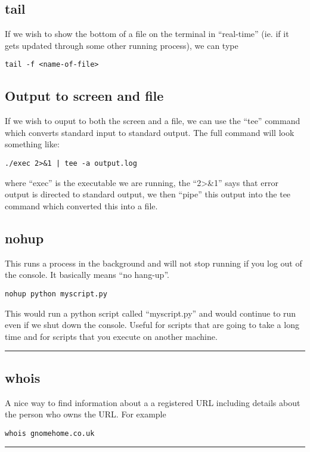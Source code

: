 \documentclass[a4paper, 10pt]{article}
\newcommand{\mybotrule}{\vspace{4mm}\hrule}
\begin{document}
\subsection*{tail}
\label{sec:tail}

If we wish to show the bottom of a file on the terminal in
``real-time'' (ie. if it gets updated through some other running
process), we can type 
\begin{verbatim}
tail -f <name-of-file>
\end{verbatim}

\subsection*{Output to screen and file}
\label{sec:output-screen-file}

If we wish to ouput to both the screen and a file, we can use the
``tee'' command which converts standard input to standard output. The
full command will look something like:
\begin{verbatim}
./exec 2>&1 | tee -a output.log
\end{verbatim}
where ``exec'' is the executable we are running, the ``2>\&1'' says
that error output is directed to standard output, we then ``pipe''
this output into the tee command which converted this into a file. 

\subsection*{nohup}
This runs a process in the background and will not stop running if you log out of the console. It basically means ``no hang-up''.
\begin{verbatim}
nohup python myscript.py
\end{verbatim}
This would run a python script called ``myscript.py'' and would continue to run even if we shut down the console. Useful for scripts that are going to take a long time and for scripts that you execute on another machine.
\mybotrule

\subsection*{whois}
A nice way to find information about a a registered URL including details about the person who owns the URL. For example
\begin{verbatim}
whois gnomehome.co.uk
\end{verbatim}
\mybotrule
\end{document}
